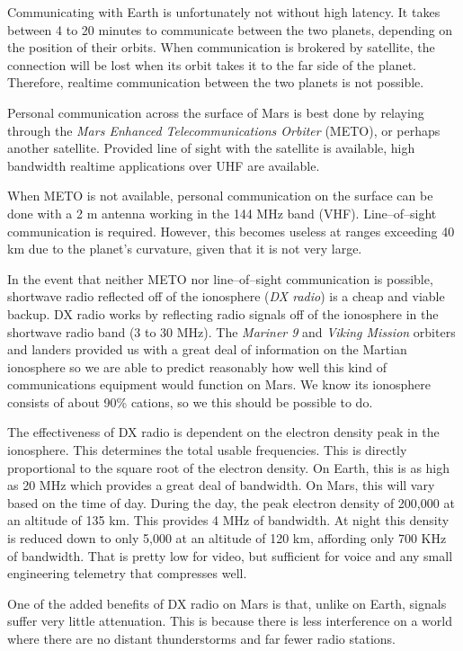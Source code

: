 
Communicating with Earth is unfortunately not without high latency. It takes between 4 to 20 minutes to communicate between the two planets, depending on the position of their orbits. When communication is brokered by satellite, the connection will be lost when its orbit takes it to the far side of the planet. Therefore, realtime communication between the two planets is not possible.

Personal communication across the surface of Mars is best done by relaying through the {\it Mars Enhanced Telecommunications Orbiter} (METO), or perhaps another satellite. Provided line of sight with the satellite is available, high bandwidth realtime applications over UHF are available.

When METO is not available, personal communication on the surface can be done with a 2 m antenna working in the 144 MHz band (VHF). Line--of--sight communication is required. However, this becomes useless at ranges exceeding 40 km due to the planet's curvature, given that it is not very large.

In the event that neither METO nor line--of--sight communication is possible, shortwave radio reflected off of the ionosphere ({\it DX radio}) is a cheap and viable backup. DX radio works by reflecting radio signals off of the ionosphere in the shortwave radio band (3 to 30 MHz). The {\it Mariner 9} and {\it Viking Mission} orbiters and landers provided us with a great deal of information on the Martian ionosphere so we are able to predict reasonably how well this kind of communications equipment would function on Mars. We know its ionosphere consists of about 90\%  cations, so we this should be possible to do.

The effectiveness of DX radio is dependent on the electron density peak in the ionosphere. This determines the total usable frequencies. This is directly proportional to the square root of the electron density. On Earth, this is as high as 20 MHz which provides a great deal of bandwidth. On Mars, this will vary based on the time of day. During the day, the peak electron density of 200,000  at an altitude of 135 km. This provides 4 MHz of bandwidth. At night this density is reduced down to only 5,000  at an altitude of 120 km, affording only 700 KHz of bandwidth. That is pretty low for video, but sufficient for voice and any small engineering telemetry that compresses well.

One of the added benefits of DX radio on Mars is that, unlike on Earth, signals suffer very little attenuation. This is because there is less interference on a world where there are no distant thunderstorms and far fewer radio stations.

